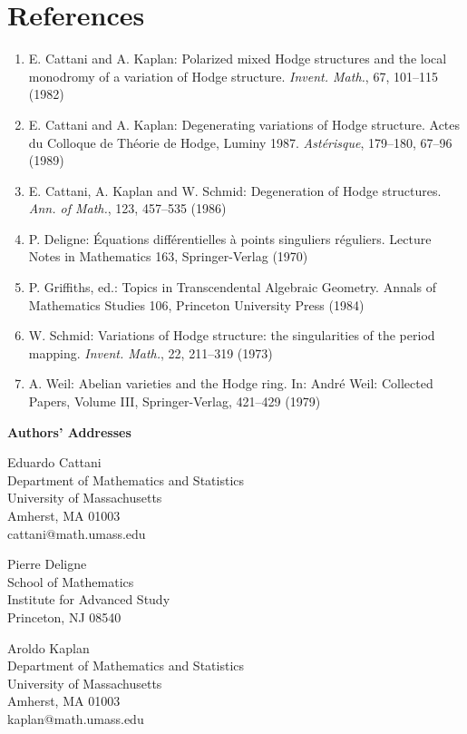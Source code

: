 \documentclass[11pt,a4paper]{article}
\theoremstyle{plain}
\theoremstyle{definition}
\begin{document}
\section*{References}

\begin{enumerate}
\item[{[1]}] E. Cattani and A. Kaplan: Polarized mixed Hodge structures and the local monodromy of a variation of Hodge structure. \textit{Invent. Math.}, 67, 101--115 (1982)
\item[{[2]}] E. Cattani and A. Kaplan: Degenerating variations of Hodge structure. Actes du Colloque de Th\'eorie de Hodge, Luminy 1987. \textit{Ast\'erisque}, 179--180, 67--96 (1989)
\item[{[3]}] E. Cattani, A. Kaplan and W. Schmid: Degeneration of Hodge structures. \textit{Ann. of Math.}, 123, 457--535 (1986)
\item[{[4]}] P. Deligne: \'Equations diff\'erentielles \`a points singuliers r\'eguliers. Lecture Notes in Mathematics 163, Springer-Verlag (1970)
\item[{[5]}] P. Griffiths, ed.: Topics in Transcendental Algebraic Geometry. Annals of Mathematics Studies 106, Princeton University Press (1984)
\item[{[6]}] W. Schmid: Variations of Hodge structure: the singularities of the period mapping. \textit{Invent. Math.}, 22, 211--319 (1973)
\item[{[7]}] A. Weil: Abelian varieties and the Hodge ring. In: Andr\'e Weil: Collected Papers, Volume III, Springer-Verlag, 421--429 (1979)
\end{enumerate}

\bigskip
\noindent\textbf{Authors' Addresses}

\medskip
\noindent Eduardo Cattani\\
Department of Mathematics and Statistics\\
University of Massachusetts\\
Amherst, MA 01003\\
cattani@math.umass.edu

\medskip
\noindent Pierre Deligne\\
School of Mathematics\\
Institute for Advanced Study\\
Princeton, NJ 08540

\medskip
\noindent Aroldo Kaplan\\
Department of Mathematics and Statistics\\
University of Massachusetts\\
Amherst, MA 01003\\
kaplan@math.umass.edu
\end{document}
